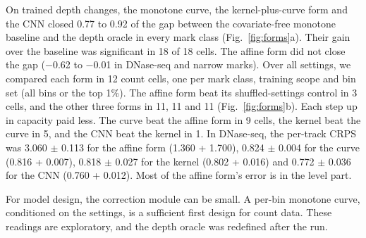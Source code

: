 \documentclass[pdflatex,sn-mathphys-num]{sn-jnl}
\newcommand{\lit}[1]{#1}
\newcommand{\dnA}{3.060}
\newcommand{\dnAOS}{1.360}
\newcommand{\dnAS}{0.113}
\newcommand{\dnASE}{1.700}
\newcommand{\dnB}{0.824}
\newcommand{\dnBOS}{0.816}
\newcommand{\dnBS}{0.004}
\newcommand{\dnBSE}{0.007}
\newcommand{\dnC}{0.818}
\newcommand{\dnCOS}{0.802}
\newcommand{\dnCS}{0.027}
\newcommand{\dnCSE}{0.016}
\newcommand{\dnD}{0.772}
\newcommand{\dnDOS}{0.760}
\newcommand{\dnDS}{0.036}
\newcommand{\dnDSE}{0.012}
\newcommand{\gcAHi}{\ensuremath{-}0.01}
\newcommand{\gcALo}{\ensuremath{-}0.62}
\newcommand{\gcBDHi}{0.92}
\newcommand{\gcBDLo}{0.77}
\newcommand{\nBDcells}{18}
\newcommand{\nBDgain}{18}
\newcommand{\nBlB}{9}
\newcommand{\nBlC}{5}
\newcommand{\nBlD}{1}
\newcommand{\nCellsB}{12}
\newcommand{\nTwA}{3}
\newcommand{\nTwB}{11}
\newcommand{\nTwC}{11}
\newcommand{\nTwD}{11}
\begin{document}
On trained depth changes, the monotone curve, the kernel-plus-curve form and the CNN closed
\gcBDLo{} to \gcBDHi{} of the gap between the covariate-free monotone baseline and the depth
oracle in every mark class (Fig.~\ref{fig:forms}a). Their gain over the baseline was
significant in \nBDgain{} of \nBDcells{} cells. The affine form did not close the gap
(\gcALo{} to \gcAHi{} in DNase-seq and narrow marks). Over all settings, we compared each form
in \nCellsB{} count cells, one per mark class, training scope and bin set (all bins or the top
\lit{1}\%). The affine form beat its shuffled-settings control in \nTwA{} cells, and the other
three forms in \nTwB{}, \nTwC{} and \nTwD{} (Fig.~\ref{fig:forms}b). Each step up in capacity
paid less. The curve beat the affine form in \nBlB{} cells, the kernel beat the curve in
\nBlC{}, and the CNN beat the kernel in \nBlD{}. In DNase-seq, the per-track CRPS was \dnA{}
$\pm$ \dnAS{} for the affine form (\dnAOS{} + \dnASE{}), \dnB{} $\pm$ \dnBS{} for the curve
(\dnBOS{} + \dnBSE{}), \dnC{} $\pm$ \dnCS{} for the kernel (\dnCOS{} + \dnCSE{}) and \dnD{} $\pm$
\dnDS{} for the CNN (\dnDOS{} + \dnDSE{}). Most of the affine form's error is in the level part.

For model design, the correction module can be small. A per-bin monotone curve, conditioned
on the settings, is a sufficient first design for count data. These readings are exploratory,
and the depth oracle was redefined after the run.
\end{document}
